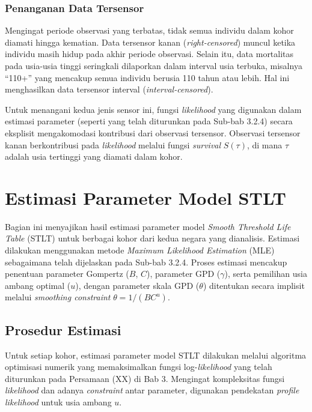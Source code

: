 \subsubsection{Penanganan Data Tersensor}
Mengingat periode observasi yang terbatas, tidak semua individu dalam kohor diamati hingga kematian. Data tersensor kanan (\textit{right-censored}) muncul ketika individu masih hidup pada akhir periode observasi. Selain itu, data mortalitas pada usia-usia tinggi seringkali dilaporkan dalam interval usia terbuka, misalnya ``110+'' yang mencakup semua individu berusia 110 tahun atau lebih. Hal ini menghasilkan data tersensor interval (\textit{interval-censored}). 

Untuk menangani kedua jenis sensor ini, fungsi \textit{likelihood} yang digunakan dalam estimasi parameter (seperti yang telah diturunkan pada Sub-bab 3.2.4) secara eksplisit mengakomodasi kontribusi dari observasi tersensor. Observasi tersensor kanan berkontribusi pada \textit{likelihood} melalui fungsi \textit{survival} $S(\tau)$, di mana $\tau$ adalah usia tertinggi yang diamati dalam kohor.

\section{Estimasi Parameter Model STLT}

Bagian ini menyajikan hasil estimasi parameter model \textit{Smooth Threshold Life Table} (STLT) untuk berbagai kohor dari kedua negara yang dianalisis. Estimasi dilakukan menggunakan metode \textit{Maximum Likelihood Estimation} (MLE) sebagaimana telah dijelaskan pada Sub-bab 3.2.4. Proses estimasi mencakup penentuan parameter Gompertz ($B$, $C$), parameter GPD ($\gamma$), serta pemilihan usia ambang optimal ($u$), dengan parameter skala GPD ($\theta$) ditentukan secara implisit melalui \textit{smoothing constraint} $\theta = 1/(BC^u)$.

\subsection{Prosedur Estimasi}

Untuk setiap kohor, estimasi parameter model STLT dilakukan melalui algoritma optimisasi numerik yang memaksimalkan fungsi log-\textit{likelihood} yang telah diturunkan pada Persamaan (XX) di Bab 3. Mengingat kompleksitas fungsi \textit{likelihood} dan adanya \textit{constraint} antar parameter, digunakan pendekatan \textit{profile likelihood} untuk usia ambang $u$.

